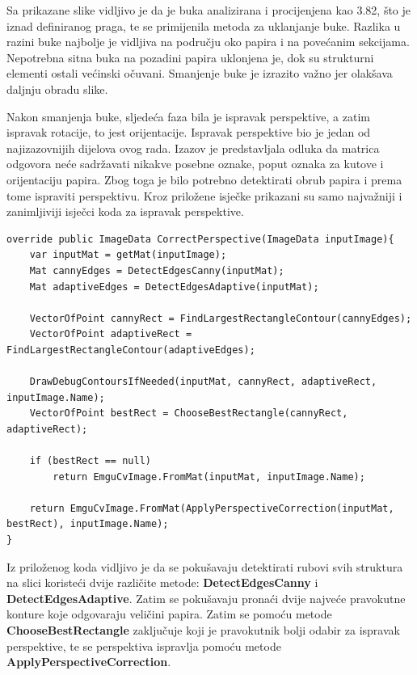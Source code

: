 \documentclass{foi}
\begin{document}
Sa prikazane slike vidljivo je da je buka analizirana i procijenjena kao 3.82, što je iznad definiranog praga, te se primijenila metoda za uklanjanje buke. Razlika u razini buke najbolje je vidljiva na području oko papira i na povećanim sekcijama. Nepotrebna sitna buka na pozadini papira uklonjena je, dok su strukturni elementi ostali većinski očuvani. Smanjenje buke je izrazito važno jer olakšava daljnju obradu slike.

Nakon smanjenja buke, sljedeća faza bila je ispravak perspektive, a zatim ispravak rotacije, to jest orijentacije. Ispravak perspektive bio je jedan od najizazovnijih dijelova ovog rada. Izazov je predstavljala odluka da matrica odgovora neće sadržavati nikakve posebne oznake, poput oznaka za kutove i orijentaciju papira. Zbog toga je bilo potrebno detektirati obrub papira i prema tome ispraviti perspektivu. Kroz priložene isječke prikazani su samo najvažniji i zanimljiviji isječci koda za ispravak perspektive.  

\begin{lstlisting}[caption={Metoda za ispravak perspektive slike}]
override public ImageData CorrectPerspective(ImageData inputImage){
    var inputMat = getMat(inputImage);
    Mat cannyEdges = DetectEdgesCanny(inputMat);
    Mat adaptiveEdges = DetectEdgesAdaptive(inputMat);

    VectorOfPoint cannyRect = FindLargestRectangleContour(cannyEdges);
    VectorOfPoint adaptiveRect = FindLargestRectangleContour(adaptiveEdges);

    DrawDebugContoursIfNeeded(inputMat, cannyRect, adaptiveRect, inputImage.Name);
    VectorOfPoint bestRect = ChooseBestRectangle(cannyRect, adaptiveRect);

    if (bestRect == null)
        return EmguCvImage.FromMat(inputMat, inputImage.Name);

    return EmguCvImage.FromMat(ApplyPerspectiveCorrection(inputMat, bestRect), inputImage.Name);
}
\end{lstlisting}

Iz priloženog koda vidljivo je da se pokušavaju detektirati rubovi svih struktura na slici koristeći dvije različite metode: \textbf{DetectEdgesCanny} i \textbf{DetectEdgesAdaptive}. Zatim se pokušavaju pronaći dvije najveće pravokutne konture koje odgovaraju veličini papira. Zatim se pomoću metode \textbf{ChooseBestRectangle} zaključuje koji je pravokutnik bolji odabir za ispravak perspektive, te se perspektiva ispravlja pomoću metode \textbf{ApplyPerspectiveCorrection}.
\end{document}
